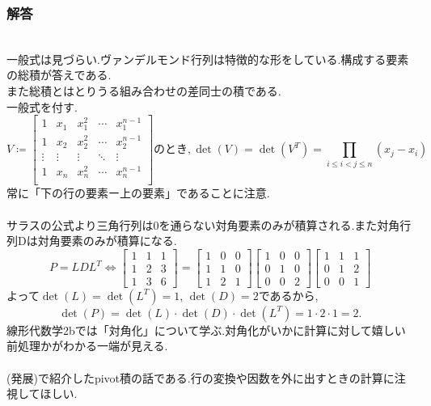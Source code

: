 \subsubsection{解答}
\noindent
{}\\
一般式は見づらい.ヴァンデルモンド行列は特徴的な形をしている.構成する要素の総積が答えである.\\
また総積とはとりうる組み合わせの差同士の積である.\\
一般式を付す.\\
\[V \coloneq
\begin{bmatrix}
    1 & x_1 & x_1^2 & \cdots & x_1^{n-1} \\
    1 & x_2 & x_2^2 & \cdots & x_2^{n-1} \\
    \vdots & \vdots & \vdots & \ddots & \vdots \\
    1 & x_n & x_n^2 & \cdots & x_n^{n-1} \\
\end{bmatrix}のとき,\det(V)=\det(V^T)=\prod_{i \leq i < j \leq n}^{}(x_j-x_i)\]
常に「下の行の要素ー上の要素」であることに注意.\\
\\
サラスの公式より三角行列は0を通らない対角要素のみが積算される.また対角行列Dは対角要素のみが積算になる.\\
\[
P=LDL^T \Leftrightarrow 
\begin{bmatrix}
    1 & 1 & 1 \\
    1 & 2 & 3 \\
    1 & 3 & 6
\end{bmatrix} =
\begin{bmatrix}1 & 0 & 0 \\1 & 1 & 0 \\ 1 & 2 & 1\end{bmatrix} 
\begin{bmatrix}1 & 0 & 0 \\0 & 1 & 0 \\0 & 0 & 2\end{bmatrix}
\begin{bmatrix}1 & 1 & 1 \\0 & 1 & 2 \\0 & 0 & 1\end{bmatrix}
\]
よって$\det(L)=\det(L^T)=1$, $\det(D)=2$であるから,
\[\det(P)=\det(L)\cdot\det(D)\cdot\det(L^T)=1\cdot2\cdot1=2.\]
線形代数学2bでは「対角化」について学ぶ.対角化がいかに計算に対して嬉しい前処理かがわかる一端が見える.\\
\\
(発展)で紹介したpivot積の話である.行の変換や因数を外に出すときの計算に注視してほしい.\\

